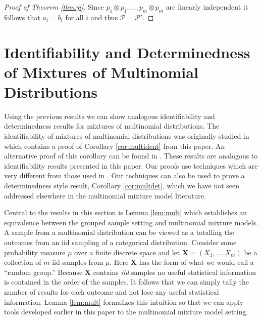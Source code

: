 \documentclass[aos,preprint]{imsart}
\def\sP{\mathscr{P}}
\def\bX{\mathbf{X}}
\theoremstyle{plain}
\theoremstyle{defintion}
\begin{document}
\begin{proof}[Proof of Theorem \ref{thm:ji}]
		Since $p_1\otimes p_1,\ldots,p_m\otimes p_m$ are linearly independent it follows that $a_i = b_i$ for all $i$ and thus $\sP = \sP'$.

	\end{proof}

	\section{Identifiability and Determinedness of Mixtures of Multinomial Distributions}\label{sec:multinomial}
	Using the previous results we can show analogous identifiability and determinedness results for mixtures of multinomial distributions. The identifiability of mixtures of multinomial distributions was originally studied in \cite{kim1984} which contains a proof of Corollary \ref{cor:multident} from this paper. An alternative proof of this corollary can be found in \cite{elmore2003}. These results are analogous to identifiability results presented in this paper. Our proofs use techniques which are very different from those used in \cite{kim1984,elmore2003}. Our techniques can also be used to prove a determinedness style result, Corollary \ref{cor:multdet}, which we have not seen addressed elsewhere in the multinomial mixture model literature.

	Central to the results in this section is Lemma \ref{lem:mult} which establishes an equivalence between the grouped sample setting and multinomial mixture models. A sample from a multinomial distribution can be viewed as a totalling the outcomes from an iid sampling of a categorical distribution. Consider some probability measure $\mu$ over a finite discrete space and let $\bX=\left( X_1,\ldots,X_m \right)$ be a collection of $m$ iid samples from $\mu$. Here $\bX$ has the form of what we would call a ``random group.'' Because $\bX$ contains {\em iid} samples no useful statistical information is contained in the order of the samples. It follows that we can simply tally the number of results for each outcome and not lose any useful statistical information. Lemma \ref{lem:mult} formalizes this intuition so that we can apply tools developed earlier in this paper to the multinomial mixture model setting.
\end{document}
